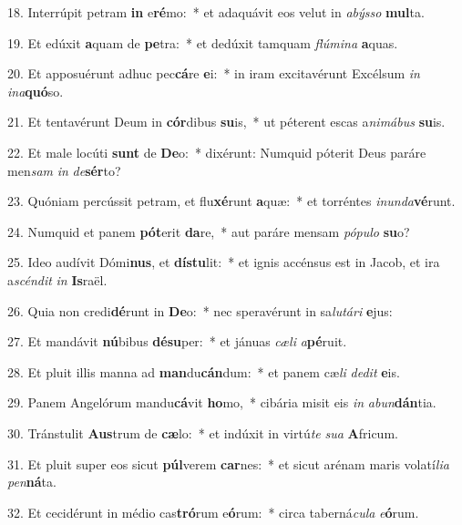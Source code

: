 18. Interrúpit petram \textbf{in} e\textbf{ré}mo:~*  et adaquávit eos velut in \textit{a}\textit{býs}\textit{so} \textbf{mul}ta.\

19. Et edúxit \textbf{a}quam de \textbf{pe}tra:~*  et dedúxit tamquam \textit{flú}\textit{mi}\textit{na} \textbf{a}quas.\

20. Et apposuérunt adhuc pec\textbf{cá}re \textbf{e}i:~*  in iram excitavérunt Excélsum \textit{in} \textit{in}\textit{a}\textbf{quó}so.\

21. Et tentavérunt Deum in \textbf{cór}dibus \textbf{su}is,~*  ut péterent escas a\textit{ni}\textit{má}\textit{bus} \textbf{su}is.\

22. Et male locúti \textbf{sunt} de \textbf{De}o:~*  dixérunt: Numquid póterit Deus paráre men\textit{sam} \textit{in} \textit{de}\textbf{sér}to?\

23. Quóniam percússit petram, et flu\textbf{xé}runt \textbf{a}quæ:~*  et torréntes \textit{in}\textit{un}\textit{da}\textbf{vé}runt.\

24. Numquid et panem \textbf{pót}erit \textbf{da}re,~*  aut paráre mensam \textit{pó}\textit{pu}\textit{lo} \textbf{su}o?\

25. Ideo audívit Dómi\textbf{nus}, et \textbf{dís}\textbf{tu}lit:~*  et ignis accénsus est in Jacob, et ira a\textit{scén}\textit{dit} \textit{in} \textbf{Is}raël.\

26. Quia non credi\textbf{dé}runt in \textbf{De}o:~*  nec speravérunt in sa\textit{lu}\textit{tá}\textit{ri} \textbf{e}jus:\

27. Et mandávit \textbf{nú}bibus \textbf{dé}\textbf{su}per:~*  et jánuas \textit{cæ}\textit{li} \textit{a}\textbf{pé}ruit.\

28. Et pluit illis manna ad \textbf{man}du\textbf{cán}dum:~*  et panem cæ\textit{li} \textit{de}\textit{dit} \textbf{e}is.\

29. Panem Angelórum mandu\textbf{cá}vit \textbf{ho}mo,~*  cibária misit eis \textit{in} \textit{ab}\textit{un}\textbf{dán}tia.\

30. Tránstulit \textbf{Aus}trum de \textbf{cæ}lo:~*  et indúxit in virtú\textit{te} \textit{su}\textit{a} \textbf{A}fricum.\

31. Et pluit super eos sicut \textbf{púl}verem \textbf{car}nes:~*  et sicut arénam maris volatí\textit{li}\textit{a} \textit{pen}\textbf{ná}ta.\

32. Et cecidérunt in médio cas\textbf{tró}rum e\textbf{ó}rum:~*  circa taberná\textit{cu}\textit{la} \textit{e}\textbf{ó}rum.\

